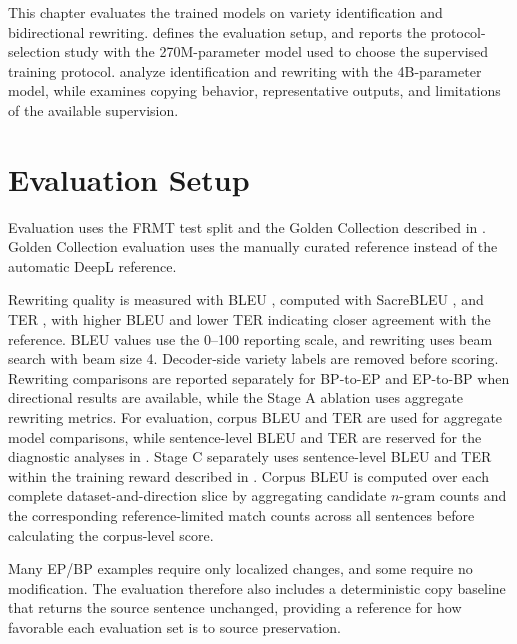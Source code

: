 \label{chap:evaluation}

This chapter evaluates the trained models on variety identification and
bidirectional rewriting.  defines the
evaluation setup, and  reports the protocol-selection
study with the 270M-parameter model used to choose the supervised training
protocol.
analyze identification and rewriting with the 4B-parameter model, while
 examines copying behavior, representative
outputs, and limitations of the available supervision.

\section{Evaluation Setup}
\label{sec:evaluation-methodology}

Evaluation uses the FRMT test split and the Golden Collection described in
. Golden Collection evaluation uses the manually curated
reference instead of the automatic DeepL reference.

Rewriting quality is measured with BLEU \citep{papineni2002bleu}, computed with
SacreBLEU \citep{post-2018-call}, and TER \citep{snover2006study}, with higher
BLEU and lower TER indicating closer agreement with the reference. BLEU values use
the 0--100 reporting scale, and
rewriting uses beam search with beam size 4. Decoder-side variety labels are
removed before scoring. Rewriting comparisons are reported separately for
BP-to-EP and EP-to-BP when directional results are available, while the Stage A
ablation uses aggregate rewriting metrics. For evaluation, corpus BLEU and TER
are used for aggregate model comparisons, while sentence-level BLEU and TER are
reserved for the diagnostic analyses in . Stage C
separately uses sentence-level BLEU and TER within the training reward described
in . Corpus BLEU is computed over
each complete dataset-and-direction slice by aggregating candidate \(n\)-gram
counts and the corresponding reference-limited match counts across all sentences
before calculating the corpus-level score.

Many EP/BP examples require only localized changes, and some require no
modification. The evaluation therefore also includes a deterministic copy
baseline that returns the source sentence unchanged, providing a reference for
how favorable each evaluation set is to source preservation.

